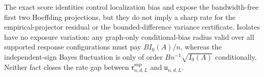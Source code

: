 The exact score identities control localization bias and expose the bandwidth-free first two Hoeffding projections, but they do not imply a sharp rate for the empirical-projector residual or the bounded-difference variance certificate.  Isolates have no exposure variation: any graph-only conditional-bias radius valid over all supported response configurations must pay \(BI_0(A)/n\), whereas the independent-sign Bayes fluctuation is only of order \(Bn^{-1}\sqrt{I_0(A)}\) conditionally.  Neither fact closes the rate gap between \(\mathfrak r^{\mathrm{sup}}_{n,d,L}\) and \(\mathfrak u_{n,d,L}\).